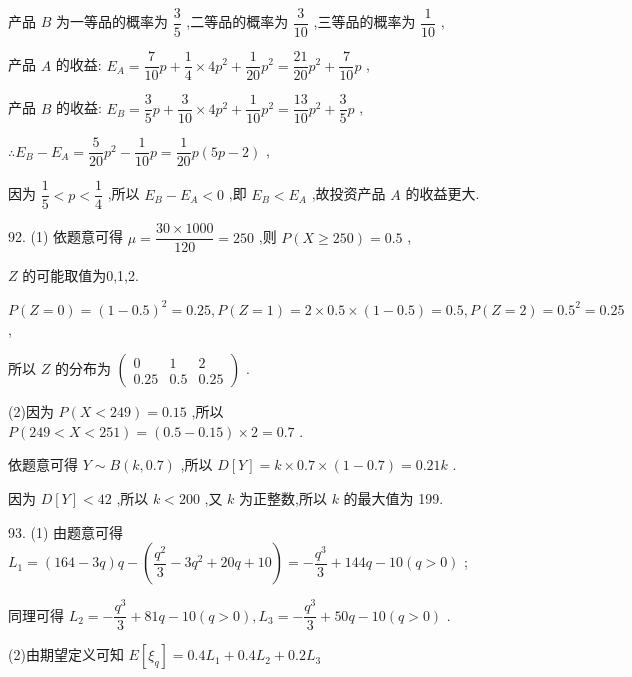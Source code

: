 产品 $B$ 为一等品的概率为 $\dfrac{3}{5}$ ,二等品的概率为 $\dfrac{3}{10}$ ,三等品的概率为 $\dfrac{1}{10}$ ,

产品 $A$ 的收益: ${E}_{A} = \dfrac{7}{10}p + \dfrac{1}{4} \times  4{p}^{2} + \dfrac{1}{20}{p}^{2} = \dfrac{21}{20}{p}^{2} + \dfrac{7}{10}p$ ,

产品 $B$ 的收益: ${E}_{B} = \dfrac{3}{5}p + \dfrac{3}{10} \times  4{p}^{2} + \dfrac{1}{10}{p}^{2} = \dfrac{13}{10}{p}^{2} + \dfrac{3}{5}p$ ,

$\therefore {E}_{B} - {E}_{A} = \dfrac{5}{20}{p}^{2} - \dfrac{1}{10}p = \dfrac{1}{20}p\left( {{5p} - 2}\right)$ ,

因为 $\dfrac{1}{5} < p < \dfrac{1}{4}$ ,所以 ${E}_{B} - {E}_{A} < 0$ ,即 ${E}_{B} < {E}_{A}$ ,故投资产品 $A$ 的收益更大.

92. (1) 依题意可得 $\mu  = \dfrac{{30} \times  {1000}}{120} = {250}$ ,则 $P\left( {X \geq  {250}}\right)  = {0.5}$ ,

$Z$ 的可能取值为0,1,2.

$P\left( {Z = 0}\right)  = {\left( 1 - {0.5}\right) }^{2} = {0.25},P\left( {Z = 1}\right)  = 2 \times  {0.5} \times  \left( {1 - {0.5}}\right)  = {0.5},P\left( {Z = 2}\right)  = {0.5}^{2} = {0.25}$ ,

所以 $Z$ 的分布为 $\left( \begin{matrix} 0 & 1 & 2 \\  {0.25} & {0.5} & {0.25} \end{matrix}\right)$ .

(2)因为 $P\left( {X < {249}}\right)  = {0.15}$ ,所以 $P\left( {{249} < X < {251}}\right)  = \left( {{0.5} - {0.15}}\right)  \times  2 = {0.7}$ .

依题意可得 $Y \sim  B\left( {k,{0.7}}\right)$ ,所以 $D\left\lbrack  Y\right\rbrack   = k \times  {0.7} \times  \left( {1 - {0.7}}\right)  = {0.21k}$ .

因为 $D\left\lbrack  Y\right\rbrack   < {42}$ ,所以 $k < {200}$ ,又 $k$ 为正整数,所以 $k$ 的最大值为 199.

93. (1) 由题意可得 ${L}_{1} = \left( {{164} - {3q}}\right) q - \left( {\dfrac{{q}^{2}}{3} - 3{q}^{2} + {20q} + {10}}\right)  =  - \dfrac{{q}^{3}}{3} + {144q} - {10}\left( {q > 0}\right)$ ;

同理可得 ${L}_{2} =  - \dfrac{{q}^{3}}{3} + {81q} - {10}\left( {q > 0}\right) ,{L}_{3} =  - \dfrac{{q}^{3}}{3} + {50q} - {10}\left( {q > 0}\right)$ .

(2)由期望定义可知 $E\left\lbrack  {\xi }_{q}\right\rbrack   = {0.4}{L}_{1} + {0.4}{L}_{2} + {0.2}{L}_{3}$

